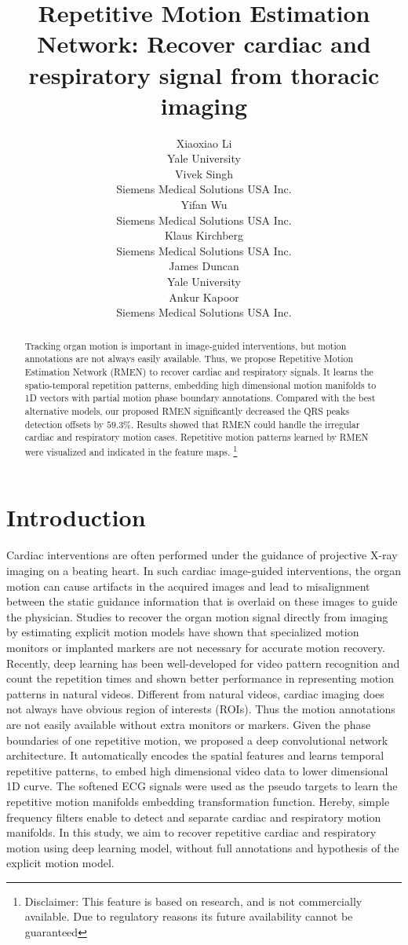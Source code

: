 \documentclass{article}
\title{Repetitive Motion Estimation Network: Recover cardiac and respiratory signal from thoracic imaging}
\author{
  Xiaoxiao Li \\
  Yale University\\
  \And
  Vivek Singh\\
  Siemens Medical Solutions USA Inc.\\
  \AND
  Yifan Wu\\
  Siemens Medical Solutions USA Inc.\\
  \And
  Klaus Kirchberg\\
  Siemens Medical Solutions USA Inc.\\
  \And
  James Duncan\\
  Yale University\\
  \And
  Ankur Kapoor\\
  Siemens Medical Solutions USA Inc.\\
}
\begin{document}
\maketitle

\begin{abstract}
Tracking organ motion is important in image-guided interventions, but motion annotations are not always easily available. Thus, we propose Repetitive Motion Estimation Network (RMEN) to recover cardiac and respiratory signals. It learns the spatio-temporal repetition patterns, embedding high dimensional motion manifolds to 1D vectors with partial motion phase boundary annotations. Compared with the best alternative models, our proposed RMEN significantly decreased the QRS peaks detection offsets by $59.3\%$. Results showed that RMEN could handle the irregular cardiac and respiratory motion cases. Repetitive motion patterns learned by RMEN were visualized and indicated in the feature maps. \footnote{Disclaimer: This feature is based on research, and is not commercially available. Due to regulatory reasons its future availability cannot be guaranteed}
\end{abstract}

\section{Introduction}
Cardiac interventions are often performed under the guidance of projective X-ray imaging on a beating heart. In such cardiac image-guided interventions, the organ motion can cause artifacts in the acquired images and lead to misalignment between the static guidance information that is overlaid on these images to guide the physician\cite{mcclelland2013respiratory}. Studies to recover the organ motion signal directly from imaging by estimating explicit motion models \cite{low2010application,shechter2006displacement} have shown that specialized motion monitors or implanted markers are not necessary for accurate motion recovery. Recently, deep learning has been well-developed for video pattern recognition \cite{karpathy2014large} and count the repetition times \cite{levy2015live} and shown better performance in representing motion patterns in natural videos. Different from natural videos, cardiac imaging does not always have obvious region of interests (ROIs). Thus the motion annotations are not easily available without extra monitors or markers. Given the phase boundaries of one repetitive motion, we proposed a deep convolutional network architecture. It automatically encodes the spatial features and learns temporal repetitive patterns, to embed high dimensional video data to lower dimensional 1D curve. The softened ECG signals were used as the pseudo targets to learn the repetitive motion manifolds embedding transformation function. Hereby, simple frequency filters enable to detect and separate cardiac and respiratory motion manifolds. In this study, we aim to recover repetitive cardiac and respiratory motion using deep learning model, without full annotations and hypothesis of the explicit motion model.
\end{document}
